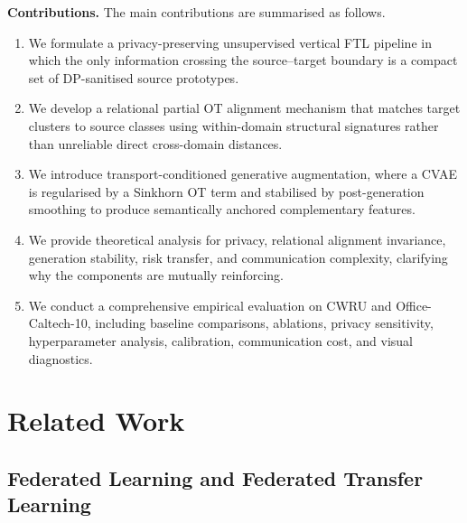 \documentclass[a4paper,fleqn]{cas-sc}
\begin{document}
\smallskip
\noindent\textbf{Contributions.}
The main contributions are summarised as follows.

\begin{enumerate}
  \item We formulate a privacy-preserving unsupervised vertical FTL pipeline
    in which the only information crossing the source--target boundary is a
    compact set of DP-sanitised source prototypes.

  \item We develop a relational partial OT alignment mechanism that matches
    target clusters to source classes using within-domain structural
    signatures rather than unreliable direct cross-domain distances.

  \item We introduce transport-conditioned generative augmentation, where a
    CVAE is regularised by a Sinkhorn OT term and stabilised by
    post-generation smoothing to produce semantically anchored complementary
    features.

  \item We provide theoretical analysis for privacy, relational alignment
    invariance, generation stability, risk transfer, and communication
    complexity, clarifying why the components are mutually reinforcing.

  \item We conduct a comprehensive empirical evaluation on CWRU and
    Office-Caltech-10, including baseline comparisons, ablations, privacy
    sensitivity, hyperparameter analysis, calibration, communication cost,
    and visual diagnostics.
\end{enumerate}

\section{Related Work}
\label{sec:related}

\subsection{Federated Learning and Federated Transfer Learning}
\end{document}
